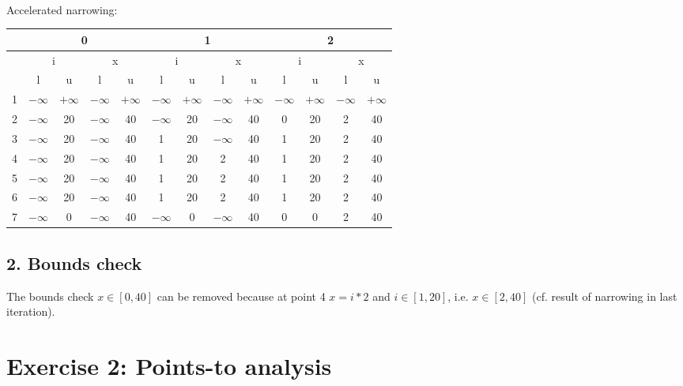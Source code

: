 \documentclass[11pt,a4paper]{scrartcl}
\begin{document}
\\
Accelerated narrowing:\\
\begin{tabular}{|c||cc|cc||cc|cc||cc|cc||}
\hline
 & \multicolumn{4}{|c|}{0} & \multicolumn{4}{|c|}{1} & \multicolumn{4}{|c|}{2} \\
\hline
\hline
 & \multicolumn{2}{|c|}{i} & \multicolumn{2}{|c|}{x} & \multicolumn{2}{|c|}{i} & \multicolumn{2}{|c|}{x} & \multicolumn{2}{|c|}{i} & \multicolumn{2}{|c|}{x} \\
 & l & u & l & u & l & u & l & u & l & u & l & u \\
\hline
1 & $-\infty$ & $+\infty$ & $-\infty$ & $+\infty$ & $-\infty$ & $+\infty$ & $-\infty$ & $+\infty$ & $-\infty$ & $+\infty$ & $-\infty$ & $+\infty$ \\
2 & $-\infty$ & 20		  & $-\infty$ & 40		  & $-\infty$ & 20		  &	$-\infty$ & 40		  &	0	      & 20		  &	2	      & 40 \\
3 & $-\infty$ & 20		  & $-\infty$ & 40		  & 1		  & 20		  &	$-\infty$ & 40		  &	1	      & 20		  &	2	      & 40 \\
4 & $-\infty$ & 20		  & $-\infty$ & 40		  & 1		  & 20		  &	2   	  & 40		  &	1	      & 20		  &	2	      & 40 \\
5 & $-\infty$ & 20		  & $-\infty$ & 40		  & 1		  & 20		  &	2   	  & 40		  &	1   	  & 20		  &	2	      & 40 \\
6 & $-\infty$ & 20		  & $-\infty$ & 40		  & 1		  & 20		  &	2   	  & 40		  &	1   	  & 20		  &	2	      & 40 \\
7 & $-\infty$ & 0		  & $-\infty$ & 40		  & $-\infty$ & 0		  &	$-\infty$ & 40		  &	0   	  & 0		  &	2	      & 40 \\
\hline
\end{tabular}

\subsection*{2. Bounds check}
The bounds check $x \in [0, 40]$ can be removed because at point 4 $x=i*2$ and $i \in [1, 20]$, i.e. $x \in [2,40]$ (cf. result of narrowing in last iteration).


\section*{Exercise 2: Points-to analysis}
\end{document}
